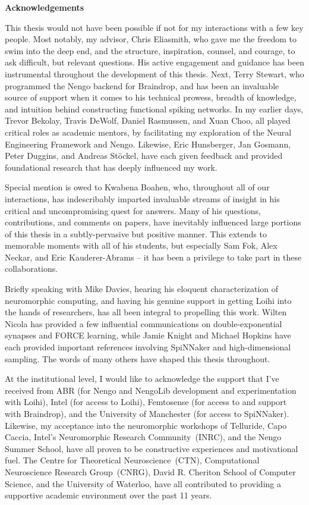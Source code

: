 {}
\begin{center}\textbf{Acknowledgements}\end{center}

This thesis would not have been possible if not for my interactions with a few key people.
Most notably, my advisor, Chris Eliasmith, who gave me the freedom to swim into the deep end, and the structure, inspiration, counsel, and courage, to ask difficult, but relevant questions.
His active engagement and guidance has been instrumental throughout the development of this thesis.
Next, Terry Stewart, who programmed the Nengo backend for Braindrop, and has been an invaluable source of support when it comes to his technical prowess, breadth of knowledge, and intuition behind constructing functional spiking networks.
In my earlier days, Trevor Bekolay, Travis DeWolf, Daniel Rasmussen, and Xuan Choo, all played critical roles as academic mentors, by facilitating my exploration of the Neural Engineering Framework and Nengo.
Likewise, Eric Hunsberger, Jan Gosmann, Peter Duggins, and Andreas St{\"o}ckel, have each given feedback and provided foundational research that has deeply influenced my work.

Special mention is owed to Kwabena Boahen, who, throughout all of our interactions, has indescribably imparted invaluable streams of insight in his critical and uncompromising quest for answers.
Many of his questions, contributions, and comments on papers, have inevitably influenced large portions of this thesis in a subtly-pervasive but positive manner.
This extends to memorable moments with all of his students, but especially Sam Fok, Alex Neckar, and Eric Kauderer-Abrams -- it has been a privilege to take part in these collaborations.

Briefly speaking with Mike Davies, hearing his eloquent characterization of neuromorphic computing, and having his genuine support in getting Loihi into the hands of researchers, has all been integral to propelling this work.
Wilten Nicola has provided a few influential communications on double-exponential synapses and FORCE learning, while Jamie Knight and Michael Hopkins have each provided important references involving SpiNNaker and high-dimensional sampling.
The words of many others have shaped this thesis throughout.

At the institutional level, I would like to acknowledge the support that I've received from
ABR (for Nengo and NengoLib development and experimentation with Loihi),
Intel (for access to Loihi),
Femtosense (for access to and support with Braindrop),
and the University of Manchester (for access to SpiNNaker).
Likewise, my acceptance into the neuromorphic workshops of Telluride, Capo Caccia, Intel's Neuromorphic Research Community~(INRC), and the Nengo Summer School, have all proven to be constructive experiences and motivational fuel.
The Centre for Theoretical Neuroscience~(CTN), Computational Neuroscience Research Group~(CNRG), David R. Cheriton School of Computer Science, and the University of Waterloo, have all contributed to providing a supportive academic environment over the past 11 years.  

